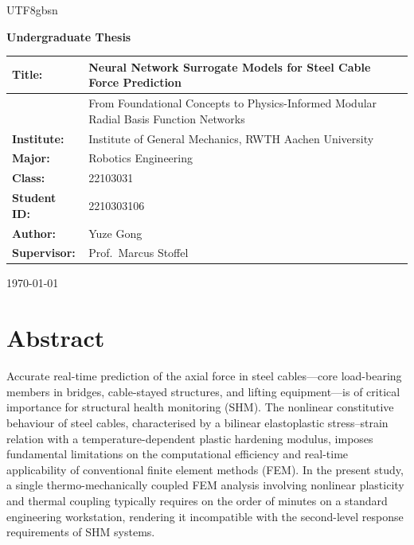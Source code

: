 \documentclass[a4paper,12pt]{report}
\newenvironment{abstracten}{%
  \chapter*{Abstract}
  \addcontentsline{toc}{chapter}{Abstract}
  \fontsize{11}{14}\selectfont\setlength{\baselineskip}{20pt}\noindent\ignorespaces
}{\par\vspace{0.5cm}}
\begin{document}
\begin{CJK}{UTF8}{gbsn}


\begin{titlepage}
  \centering
  \vspace{2cm}
  {\fontsize{20}{24}\selectfont\bfseries Undergraduate Thesis\par}
  \vspace{3cm}
  \begin{tabular}{p{3.5cm}p{9cm}}
    \hline
    \textbf{Title:} & Neural Network Surrogate Models for Steel Cable Force Prediction \\
    \hline
    & \small From Foundational Concepts to Physics-Informed Modular Radial Basis Function Networks \\
    \hline
    \textbf{Institute:} & Institute of General Mechanics, RWTH Aachen University \\
    \hline
    \textbf{Major:} & Robotics Engineering \\
    \hline
    \textbf{Class:} & 22103031 \\
    \hline
    \textbf{Student ID:} & 2210303106 \\
    \hline
    \textbf{Author:} & Yuze Gong \\
    \hline
    \textbf{Supervisor:} & Prof.\ Marcus Stoffel \\
    \hline
  \end{tabular}
  \vfill
  {\large \today\par}
\end{titlepage}

\begin{abstracten}
Accurate real-time prediction of the axial force in steel cables---core load-bearing members
in bridges, cable-stayed structures, and lifting equipment---is of critical importance for
structural health monitoring (SHM). The nonlinear constitutive behaviour of steel cables,
characterised by a bilinear elastoplastic stress--strain relation with a temperature-dependent
plastic hardening modulus, imposes fundamental limitations on the computational efficiency
and real-time applicability of conventional finite element methods (FEM). In the present study, a single thermo-mechanically coupled FEM analysis involving 
nonlinear plasticity and thermal coupling typically requires on the order of minutes 
on a standard engineering workstation, rendering it incompatible with the 
second-level response requirements of SHM systems.


\end{abstracten}
\end{CJK}
\end{document}
